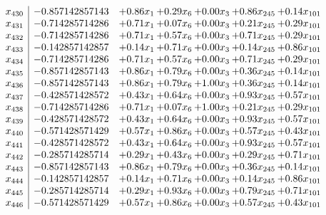 \documentclass[8pt]{article}
\begin{document}
\[\begin{array}{c| c c@{\hskip 2pt} c@{\hskip 2pt} c@{\hskip 2pt} c@{\hskip 2pt} c@{\hskip 2pt} }
 x_{430}   &  -0.857142857143 & +  0.86 x_{1} & +  0.29 x_{6} & +  0.00 x_{3} & +  0.86 x_{245} & +  0.14 x_{101}\\
 x_{431}   &  -0.714285714286 & +  0.71 x_{1} & +  0.07 x_{6} & +  0.00 x_{3} & +  0.21 x_{245} & +  0.29 x_{101}\\
 x_{432}   &  -0.714285714286 & +  0.71 x_{1} & +  0.57 x_{6} & +  0.00 x_{3} & +  0.71 x_{245} & +  0.29 x_{101}\\
 x_{433}   &  -0.142857142857 & +  0.14 x_{1} & +  0.71 x_{6} & +  0.00 x_{3} & +  0.14 x_{245} & +  0.86 x_{101}\\
 x_{434}   &  -0.714285714286 & +  0.71 x_{1} & +  0.57 x_{6} & +  0.00 x_{3} & +  0.71 x_{245} & +  0.29 x_{101}\\
 x_{435}   &  -0.857142857143 & +  0.86 x_{1} & +  0.79 x_{6} & +  0.00 x_{3} & +  0.36 x_{245} & +  0.14 x_{101}\\
 x_{436}   &  -0.857142857143 & +  0.86 x_{1} & +  0.79 x_{6} & +  1.00 x_{3} & +  0.36 x_{245} & +  0.14 x_{101}\\
 x_{437}   &  -0.428571428572 & +  0.43 x_{1} & +  0.64 x_{6} & +  0.00 x_{3} & +  0.93 x_{245} & +  0.57 x_{101}\\
 x_{438}   &  -0.714285714286 & +  0.71 x_{1} & +  0.07 x_{6} & +  1.00 x_{3} & +  0.21 x_{245} & +  0.29 x_{101}\\
 x_{439}   &  -0.428571428572 & +  0.43 x_{1} & +  0.64 x_{6} & +  0.00 x_{3} & +  0.93 x_{245} & +  0.57 x_{101}\\
 x_{440}   &  -0.571428571429 & +  0.57 x_{1} & +  0.86 x_{6} & +  0.00 x_{3} & +  0.57 x_{245} & +  0.43 x_{101}\\
 x_{441}   &  -0.428571428572 & +  0.43 x_{1} & +  0.64 x_{6} & +  0.00 x_{3} & +  0.93 x_{245} & +  0.57 x_{101}\\
 x_{442}   &  -0.285714285714 & +  0.29 x_{1} & +  0.43 x_{6} & +  0.00 x_{3} & +  0.29 x_{245} & +  0.71 x_{101}\\
 x_{443}   &  -0.857142857143 & +  0.86 x_{1} & +  0.79 x_{6} & +  0.00 x_{3} & +  0.36 x_{245} & +  0.14 x_{101}\\
 x_{444}   &  -0.142857142857 & +  0.14 x_{1} & +  0.71 x_{6} & +  0.00 x_{3} & +  0.14 x_{245} & +  0.86 x_{101}\\
 x_{445}   &  -0.285714285714 & +  0.29 x_{1} & +  0.93 x_{6} & +  0.00 x_{3} & +  0.79 x_{245} & +  0.71 x_{101}\\
 x_{446}   &  -0.571428571429 & +  0.57 x_{1} & +  0.86 x_{6} & +  0.00 x_{3} & +  0.57 x_{245} & +  0.43 x_{101}\\

\end{array}\]
\end{document}
